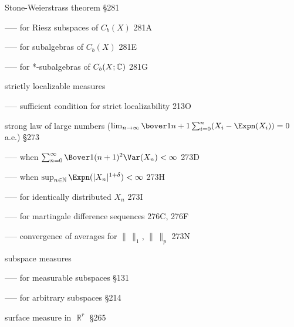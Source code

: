 















Stone-Weierstrass theorem \S281

----- for Riesz subspaces of $C_b(X)$ 281A

----- for subalgebras of $C_b(X)$ 281E

----- for *-subalgebras of $C_b(X;\Bbb C)$ 281G



strictly localizable measures

----- sufficient condition for strict localizability 213O



strong law of large numbers
($\lim_{n\to\infty}\bover1{n+1}\sum_{i=0}^n(X_i-\Expn(X_i))=0$ a.e.)
\S273


----- when $\sum_{n=0}^{\infty}\Bover1{(n+1)^2}\Var(X_n)<\infty$ 273D


----- when $\sup_{n\in\Bbb N}\Expn(|X_n|^{1+\delta})<\infty$ 273H


----- for identically distributed $X_n$ 273I

----- for martingale difference sequences 276C, 276F

----- convergence of averages for $\|\,\|_1$, $\|\,\|_p$ 273N
















subspace measures

----- for measurable subspaces \S131

----- for arbitrary subspaces \S214




surface measure in $\BbbR^r$ \S265







\indexmedskip











